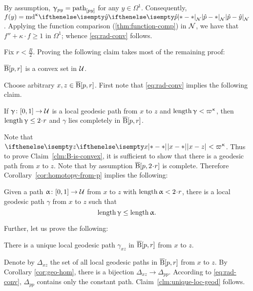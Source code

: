 By assumption,
$\upgamma_{p y}=\mathrm{path}_{[p y]}$ for any $y\in\Omega^1$. 
Consequently,
 $f(y)\z=\md\kappa\dist[{{}}]{\hat{p}}{\hat{y}}{\spc{N}}$.
Applying the function comparison (\ref{thm:function-comp}) in $\mathcal{N}$,
we have that $f''+\kappa\cdot f\ge 1$ in $\Omega^1$;
whence \ref{eq:rad-conv} follows.
\claimqeds

Fix $r<\tfrac R2$. Proving the following claim takes most of the remaining proof:

\begin{clm}{}\label{clm:B-is-convex}
$\overline{\mathrm{B}}{}[ p,r]$ is a convex set in $\mathcal{U}$.
\end{clm}

Choose arbitrary $x,z\in \cBall[ p,r]$.
First note that \ref{eq:rad-conv} implies the following claim.

\begin{clm}{}\label{clm:B-is-almost-convex}
If $ \gamma\:[0,1]\to\spc{U}$ 
is a local geodesic path from $x$ to $z$ and  
$\length \gamma\z<\varpi\kappa$,  
then $\length \gamma \le 2\cdot r$ 
and $ \gamma$ lies completely in $\overline{\mathrm{B}}{}[ p,r]$.
\end{clm}

Note that  $\dist{x}{z}{}<\varpi\kappa$.
Thus to prove Claim~\ref{clm:B-is-convex}, it is sufficient to show that there is a geodesic path from $x$ to $z$.
Note that by assumption $\cBall[p,2\cdot r]$ is complete.
Therefore Corollary~\ref{cor:homotopy-from-p} implies the following:

\begin{clm}{}\label{clm:loc-geod<path}
Given a path $\alpha\:[0,1]\to\spc{U}$ from $x$ to $z$ with $\length\alpha<2\cdot r$,
there is a local geodesic path $\gamma$ from $x$ to $z$ such that
\[\length\gamma\le\length\alpha.\]

\end{clm}

Further, let us prove the following:

\begin{clm}{}\label{clm:unique-loc-geod}
There is a unique local geodesic path $\gamma_{x z}$ in $\overline{\mathrm{B}}{}[ p,r]$ from $x$ to $z$.
\end{clm}

Denote by $\Delta_{x z}$ the set of all local geodesic paths in $\overline{\mathrm{B}}{}[ p,r]$ from $x$ to $z$.
By Corollary \ref{cor:geo-hom}, there is a  bijection $\Delta_{x z}\to\Delta_{p p}$.
According to \ref{eq:rad-conv}, 
$\Delta_{p p}$ contains only the constant path.
Claim~\ref{clm:unique-loc-geod} follows.


